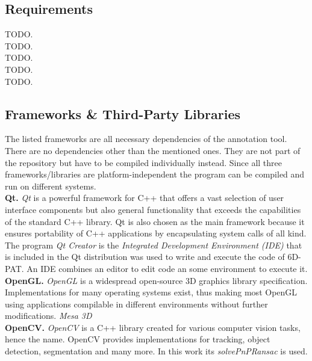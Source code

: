 \subsection{Requirements}

TODO. \\

TODO. \\

TODO. \\

TODO. \\

TODO. \\

\subsection{Frameworks \& Third-Party Libraries}

The listed frameworks are all necessary dependencies of the annotation tool. There are no dependencies other than the mentioned ones. They are not part of the repository but have to be compiled individually instead. Since all three frameworks/libraries are platform-independent the program can be compiled and run on different systems. \\

\noindent\textbf{Qt.} \textit{Qt} \cite{qt} is a powerful framework for C++ that offers a vast selection of user interface components but also general functionality that exceeds the capabilities of the standard C++ library. Qt is also chosen as the main framework because it ensures portability of C++ applications by encapsulating system calls of all kind. The program \textit{Qt Creator} is the \textit{Integrated Development Environment (IDE)} that is included in the Qt distribution was used to write and execute the code of 6D-PAT. An IDE combines an editor to edit code an some environment to execute it. \\

\noindent\textbf{OpenGL.} \textit{OpenGL} \cite{opengl} is a widespread open-source 3D graphics library specification. Implementations for many operating systems exist, thus making most OpenGL using applications compilable in different environments without further modifications. \textit{Mesa 3D} \\

\noindent\textbf{OpenCV.} \textit{OpenCV} \cite{opencv} is a C++ library created for various computer vision tasks, hence the name. OpenCV provides implementations for tracking, object detection, segmentation and many more. In this work its \textit{solvePnPRansac} is used. \\

